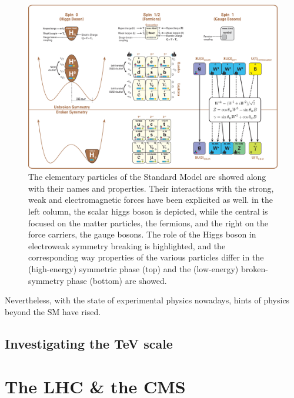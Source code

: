 	\begin{figure}[H]
		\centering
		\hspace*{-0.1\linewidth}
		\includegraphics[width=1.2\linewidth]{fig/chapt2/Standard_Model_Of_Particle_Physics.png}
		\caption{\label{fig:SM} The elementary particles of the Standard Model are showed along with their names and properties. Their interactions with the strong, weak and electromagnetic forces have been explicited as well. in the left column, the scalar higgs boson is depicted, while the central is focused on the matter particles, the fermions, and the right on the force carriers, the gauge bosons. The role of the Higgs boson in electroweak symmetry breaking is highlighted, and the corresponding way properties of the various particles differ in the (high-energy) symmetric phase (top) and the (low-energy) broken-symmetry phase (bottom) are showed.}
	\end{figure}
	
	Nevertheless, with the state of experimental physics nowadays, hints of physics beyond the SM have rised.
	
	\subsection{Investigating the TeV scale}
	\label{chapt2:ssec:TeV}

\section{The \acl{LHC} \& the \acl{CMS}}
\label{chapt2:sec:LHC-CMS}


